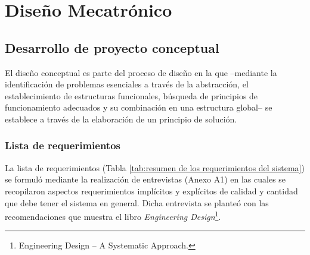 
\pagestyle{myportland}
\doublespacing
\chapter[----- Diseño Mecatrónico]{Diseño Mecatrónico}
\thispagestyle{myportland}

\section{Desarrollo de proyecto conceptual}

El diseño conceptual es parte del proceso de diseño en la que --mediante la identificación de problemas esenciales a través de la abstracción, el establecimiento de estructuras funcionales, búsqueda de principios de funcionamiento adecuados y su combinación en una estructura global-- se establece a través de la elaboración de un principio de solución.\cite[p.~159]{Pahl2007}

\subsection{Lista de requerimientos}

La lista de requerimientos (Tabla \ref{tab:resumen de los requerimientos del sistema}) se formuló mediante la realización de entrevistas (Anexo  A1) en las cuales se recopilaron aspectos requerimientos implícitos y explícitos de calidad y cantidad que debe tener el sistema en general. Dicha entrevista se planteó con las recomendaciones que muestra el libro \textit{Engineering Design}\footnote{Engineering Design – A Systematic Approach.\cite[p.~144-158]{Pahl2007}}.


